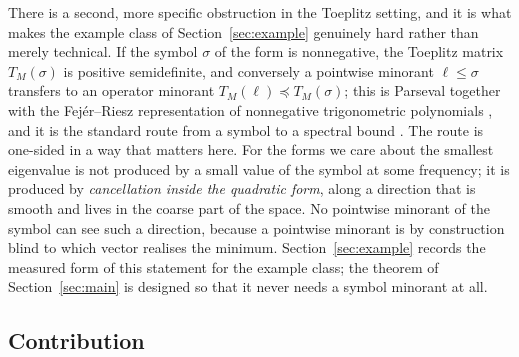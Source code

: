 \documentclass[11pt,a4paper]{article}
\theoremstyle{plain}
\theoremstyle{definition}
\newcommand{\Tm}[1]{T_{#1}}
\begin{document}
There is a second, more specific obstruction in the Toeplitz setting, and it is what
makes the example class of Section~\ref{sec:example} genuinely hard rather than
merely technical. If the symbol $\sigma$ of the form is nonnegative, the Toeplitz
matrix $\Tm{M}(\sigma)$ is positive semidefinite, and conversely a pointwise minorant
$\ell\le\sigma$ transfers to an operator minorant $\Tm{M}(\ell)\preceq\Tm{M}(\sigma)$;
this is Parseval together with the Fej\'er--Riesz representation of nonnegative
trigonometric polynomials \cite{Fejer1916,Riesz1916}, and it is the standard route
from a symbol to a spectral bound \cite{KMS1953,GrenanderSzego1958}. The route is
one-sided in a way that matters here. For the forms we care about the smallest
eigenvalue is not produced by a small value of the symbol at some frequency; it is
produced by \emph{cancellation inside the quadratic form}, along a direction that is
smooth and lives in the coarse part of the space. No pointwise minorant of the symbol
can see such a direction, because a pointwise minorant is by construction blind to
which vector realises the minimum. Section~\ref{sec:example} records the measured
form of this statement for the example class; the theorem of
Section~\ref{sec:main} is designed so that it never needs a symbol minorant at all.

\subsection{Contribution}
\end{document}
